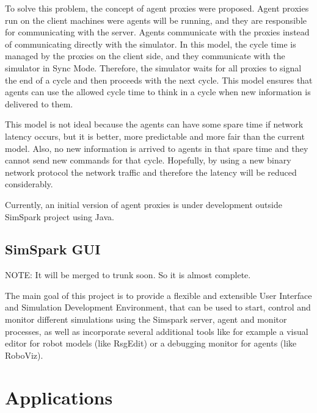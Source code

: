 \documentclass{llncs}
\begin{document}
To solve this problem, the concept of agent proxies were proposed. Agent proxies
run on the client machines were agents will be running, and they are responsible for
communicating with the server. Agents communicate with the proxies instead of 
communicating directly with the simulator. In this model, the cycle time is managed
by the proxies on the client side, and they communicate with the simulator in Sync Mode.
Therefore, the simulator waits for all proxies to signal the end of a cycle and 
then proceeds with the next cycle. This model ensures that agents can use the allowed
cycle time to think in a cycle when new information is delivered to them. 

This model is not ideal because the agents can have some spare time if network latency
occurs, but it is better, more predictable and more fair than the current model. Also,
no new information is arrived to agents in that spare time and they cannot send new 
commands for that cycle. Hopefully, by using a new binary network protocol the network 
traffic and therefore the latency will be reduced considerably.

Currently, an initial version of agent proxies is under development outside SimSpark
project using Java.

\subsection{SimSpark GUI}

NOTE: It will be merged to trunk soon. So it is almost complete.

The main goal of this project is to provide a flexible and extensible User Interface and Simulation Development Environment, that can be used to start, control and monitor different simulations using the Simspark server, agent and monitor processes, as well as incorporate several additional tools like for example a visual editor for robot models (like RsgEdit) or a debugging monitor for agents (like RoboViz). 

\section{Applications}
\label{s:application}
\end{document}
